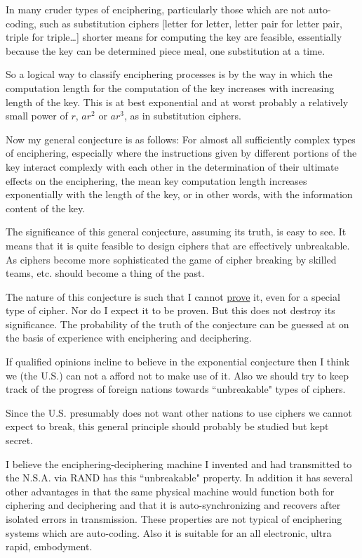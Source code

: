 \documentclass[11pt]{article}
\begin{document}
In many cruder types of enciphering, particularly those which are not auto-coding, such as substitution ciphers [letter for letter, letter pair for letter pair, triple for triple\ldots] shorter means for computing the key are feasible, essentially because the key can be determined piece meal, one substitution at a time.

So a logical way to classify enciphering processes is by the way in which the computation  length  for  the  computation  of  the  key  increases  with  increasing length of the key.  This is at best exponential and at worst probably a relatively small power of $r$, $ar^2$ or $ar^3$, as in substitution ciphers.

Now my general conjecture is as follows:  For almost all sufficiently complex types of enciphering, especially where the instructions given by different portions of  the  key  interact  complexly  with  each  other  in  the  determination  of  their ultimate effects on the enciphering, the mean key computation length increases exponentially with the length of the key, or in other words, with the information content of the key.

The  significance  of  this  general  conjecture,  assuming  its  truth,  is  easy  to see.   It  means  that  it  is  quite  feasible  to  design  ciphers  that  are  effectively unbreakable.  As ciphers become more sophisticated the game of cipher breaking by skilled teams, etc. should become a thing of the past.

The nature of this conjecture is such that I cannot \underline{prove} it, even for a special type of cipher.  Nor do I expect it to be proven.  But this does not destroy its significance.  The probability of the truth of the conjecture can be guessed at on the basis of experience with enciphering and deciphering.

If qualified opinions incline to believe in the exponential conjecture then I think we (the U.S.) can not a afford not to make use of it.  Also we should try to keep track of the progress of foreign nations towards ``unbreakable" types of ciphers.

Since  the  U.S.  presumably  does  not  want  other  nations  to  use  ciphers  we cannot expect to break, this general principle should probably be studied but kept secret.

I believe the enciphering-deciphering machine I invented and had transmitted to the N.S.A. via RAND has this ``unbreakable" property.  In addition it has  several  other  advantages  in  that  the  same  physical  machine  would  function both for ciphering and deciphering and that it is auto-synchronizing and recovers  after  isolated  errors  in  transmission.   These  properties  are  not  typical of enciphering systems which are auto-coding.  Also it is suitable for an all electronic, ultra rapid, embodyment.
\end{document}
